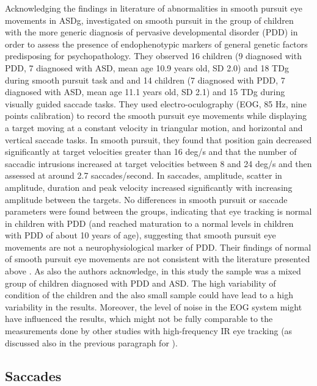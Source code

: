Acknowledging the findings in literature of abnormalities in smooth pursuit eye movements in ASDg, \cite{kemner2004smoothpursuit} investigated on smooth pursuit in the group of children with the more generic diagnosis of pervasive developmental disorder (PDD) in order to assess the presence of endophenotypic markers of general genetic factors predisposing for psychopathology. They observed 16 children (9 diagnosed with PDD, 7 diagnosed with ASD, mean age 10.9 years old, SD 2.0) and 18 TDg during smooth pursuit task and and 14 children (7 diagnosed with PDD, 7 diagnosed with ASD, mean age 11.1 years old, SD 2.1) and 15 TDg during visually guided saccade tasks. They used electro-oculography (EOG, 85 Hz, nine points calibration) to record the smooth pursuit eye movements while displaying a target moving at a constant velocity in triangular motion, and horizontal and vertical saccade tasks.
In smooth pursuit, they found that position gain decreased significantly at target velocities greater than 16 deg/s and that the number of saccadic intrusions increased at target velocities between 8 and 24 deg/s and then assessed at around 2.7 saccades/second.
In saccades, amplitude, scatter in amplitude, duration and peak velocity increased significantly with increasing amplitude between the targets.
No differences in smooth pursuit or saccade parameters were found between the groups, indicating that eye tracking is normal in children with PDD (and reached maturation to a normal levels in children with PDD of about 10 years of age), suggesting that smooth pursuit eye movements are not a neurophysiological marker of PDD. Their findings of normal of smooth pursuit eye movements are not consistent with the literature presented above \citep{takarae2004smoothpursuit,johnson2016review}. As also the authors acknowledge, in this study the sample was a mixed group of children diagnosed with PDD and ASD. The high variability of condition of the children and the also small sample could have lead to a high variability in the results. Moreover, the level of noise in the EOG system might have influenced the results, which might not be fully comparable to the measurements done by other studies with high-frequency IR eye tracking (as discussed also in the previous paragraph for \citealp{vonhofsten2009lookingevents}).


\subsection{Saccades}
\label{sec:saccadestheory}

